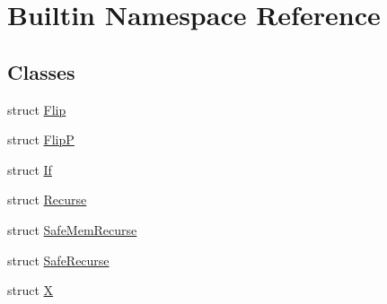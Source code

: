 \hypertarget{namespace_builtin}{}\section{Builtin Namespace Reference}
\label{namespace_builtin}
\subsection*{Classes}
\begin{DoxyCompactItemize}
\item 
struct \hyperlink{struct_builtin_1_1_flip}{Flip}
\item 
struct \hyperlink{struct_builtin_1_1_flip_p}{FlipP}
\item 
struct \hyperlink{struct_builtin_1_1_if}{If}
\item 
struct \hyperlink{struct_builtin_1_1_recurse}{Recurse}
\item 
struct \hyperlink{struct_builtin_1_1_safe_mem_recurse}{Safe\+Mem\+Recurse}
\item 
struct \hyperlink{struct_builtin_1_1_safe_recurse}{Safe\+Recurse}
\item 
struct \hyperlink{struct_builtin_1_1_x}{X}
\end{DoxyCompactItemize}

